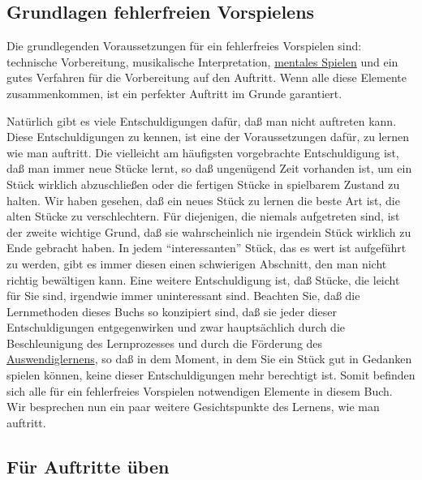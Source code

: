 \subsection{Grundlagen fehlerfreien Vorspielens}
\label{c1iii14b}

Die grundlegenden Voraussetzungen für ein fehlerfreies Vorspielen sind: technische Vorbereitung, musikalische Interpretation, \hyperref[c1ii12mental]{mentales Spielen} und ein gutes Verfahren für die Vorbereitung auf den Auftritt.
Wenn alle diese Elemente zusammenkommen, ist ein perfekter Auftritt im Grunde garantiert.

Natürlich gibt es viele Entschuldigungen dafür, daß man nicht auftreten kann.
Diese Entschuldigungen zu kennen, ist eine der Voraussetzungen dafür, zu lernen wie man auftritt.
Die vielleicht am häufigsten vorgebrachte Entschuldigung ist, daß man immer neue Stücke lernt, so daß ungenügend Zeit vorhanden ist, um ein Stück wirklich abzuschließen oder die fertigen Stücke in spielbarem Zustand zu halten.
Wir haben gesehen, daß ein neues Stück zu lernen die beste Art ist, die alten Stücke zu verschlechtern.
Für diejenigen, die niemals aufgetreten sind, ist der zweite wichtige Grund, daß sie wahrscheinlich nie irgendein Stück wirklich zu Ende gebracht haben.
In jedem \enquote{interessanten} Stück, das es wert ist aufgeführt zu werden, gibt es immer diesen einen schwierigen Abschnitt, den man nicht richtig bewältigen kann.
Eine weitere Entschuldigung ist, daß Stücke, die leicht für Sie sind, irgendwie immer uninteressant sind.
Beachten Sie, daß die Lernmethoden dieses Buchs so konzipiert sind, daß sie jeder dieser Entschuldigungen entgegenwirken und zwar hauptsächlich durch die Beschleunigung des Lernprozesses und durch die Förderung des \hyperref[c1iii6]{Auswendiglernens},
so daß in dem Moment, in dem Sie ein Stück gut in Gedanken spielen können, keine dieser Entschuldigungen mehr berechtigt ist.
Somit befinden sich alle für ein fehlerfreies Vorspielen notwendigen Elemente in diesem Buch.
Wir besprechen nun ein paar weitere Gesichtspunkte des Lernens, wie man auftritt.


\subsection{Für Auftritte üben}
\label{c1iii14c}

